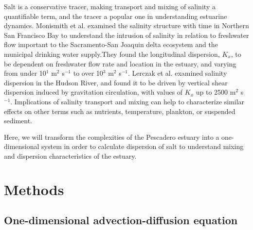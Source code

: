Salt is a conservative tracer, making transport and mixing of salinity a quantifiable term, and the tracer a popular one in understanding estuarine dynamics. Monismith et al. \parencite*{monismith_structure_2002} examined the salinity structure with time in Northern San Francisco Bay to understand the intrusion of salinity in relation to freshwater flow important to the Sacramento-San Joaquin delta ecosystem and the municipal drinking water supply.They found the longitudinal dispersion, $K_x$, to be dependent on freshwater flow rate and location in the estuary, and varying from under 10$^1$ m$^2$ s$^{-1}$ to over 10$^3$ m$^2$ s$^{-1}$. Lerczak et al. \parencite*{lerczak_mechanisms_2006} examined salinity dispersion in the Hudson River, and found it to be driven by vertical shear dispersion induced by gravitation circulation, with values of $K_x$ up to 2500 m$^2$ s$^{-1}$. Implications of salinity transport and mixing can help to characterize similar effects on other terms such as nutrients, temperature, plankton, or suspended sediment. 

Here, we will transform the complexities of the Pescadero estuary into a one-dimensional system in order to calculate dispersion of salt to understand mixing and dispersion characteristics of the estuary.


\section{Methods} \label{sec:ch4methods}

\subsection{One-dimensional advection-diffusion equation} \label{ssec:1dadvdif}

